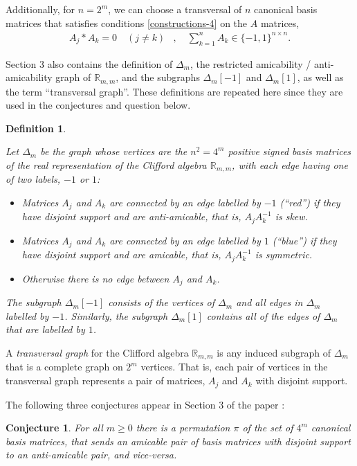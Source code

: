 \documentclass[12pt,a4paper]{article}
\newcommand{\mb}[1]{\mathbb{#1}}
\newcommand{\R}{\mb{R}}
\newtheorem{Conjecture}{Conjecture}
\newtheorem{Definition}{Definition}
\begin{document}
Additionally, for $n=2^m$, we can choose a transversal of $n$ canonical basis matrices that
satisfies conditions \eqref{constructions-4} on the $A$ matrices,
%
\begin{align}
%
 A_j \ast A_k = 0 \quad (j \neq k)&,
\quad
\sum_{k=1}^n A_k \in \{-1,1\}^{n \times n}.
%
\label{A-property-2}
\end{align}

Section 3 also contains the definition of $\varDelta_m$, the restricted amicability / anti-amicability graph of $\R_{m,m}$,
and the subgraphs $\varDelta_m[-1]$ and $\varDelta_m[1]$, as well as the term ``transversal graph''.
These definitions are repeated here since they are used in the conjectures and question below.
\begin{Definition}\label{definition-delta}
\cite[p. 225]{Leo14Constructions}

Let $\varDelta_m$ be the graph whose vertices are the $n^2=4^m$
positive signed basis matrices of the real representation
of the Clifford algebra $\R_{m,m}$,
with each edge having one of two labels, $-1$ or $1$:
\begin{itemize}
\item
Matrices $A_j$ and $A_k$ are connected by an edge labelled by $-1$ (``red'') if they have disjoint support and are anti-amicable,
that is, $A_j A_k^{-1}$ is skew.
\item
Matrices $A_j$ and $A_k$ are connected by an edge labelled by $1$ (``blue'') if they have disjoint support and are amicable,
that is, $A_j A_k^{-1}$ is symmetric.
\item
Otherwise there is no edge between $A_j$ and $A_k$.
\end{itemize}
The subgraph $\varDelta_m[-1]$ consists of the vertices of $\varDelta_m$ and all edges in $\varDelta_m$ labelled by $-1$.
Similarly, the subgraph $\varDelta_m[1]$ contains all of the edges of $\varDelta_m$ that are labelled by $1$.
\end{Definition}

A \emph{transversal graph} for the Clifford algebra $\R_{m,m}$
is any induced subgraph of $\varDelta_m$ that is a complete graph on $2^m$ vertices.
That is, each pair of vertices in the transversal graph represents a pair of matrices,
$A_j$ and $A_k$ with disjoint support.

The following three conjectures appear in Section 3 of the paper \cite{Leo14Constructions}:

\begin{Conjecture}\label{conjecture-1}
%
For all $m \geqslant 0$ there is a permutation $\pi$ of the set of $4^m$ canonical basis matrices,
that sends an amicable pair of basis matrices with disjoint support to an anti-amicable pair, and vice-versa.
%
\end{Conjecture}
\end{document}
